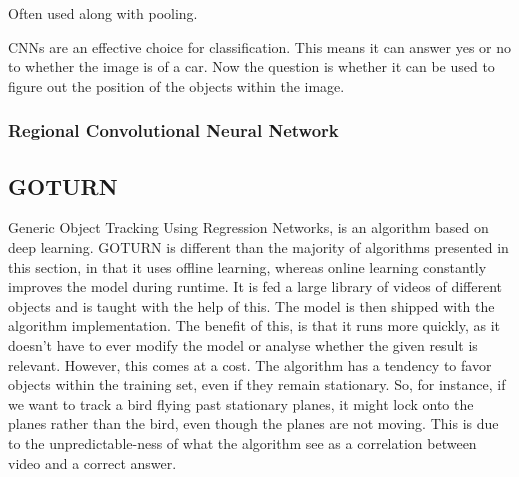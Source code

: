 Often used along with pooling.

CNNs are an effective choice for classification. 
This means it can answer yes or no to whether the image is of a car.
Now the question is whether it can be used to figure out the position of the objects within the image.



\subsubsection{Regional Convolutional Neural Network}


\subsection{GOTURN}
Generic Object Tracking Using Regression Networks, is an algorithm based on deep learning.\cite{goturn}
GOTURN is different than the majority of algorithms presented in this section, in that it uses offline learning, whereas online learning constantly improves the model during runtime.
It is fed a large library of videos of different objects and is taught with the help of this.
The model is then shipped with the algorithm implementation.
The benefit of this, is that it runs more quickly, as it doesn't have to ever modify the model or analyse whether the given result is relevant.
However, this comes at a cost. 
The algorithm has a tendency to favor objects within the training set, even if they remain stationary.
So, for instance, if we want to track a bird flying past stationary planes, it might lock onto the planes rather than the bird, even though the planes are not moving.
This is due to the unpredictable-ness of what the algorithm see as a correlation between video and a correct answer.


